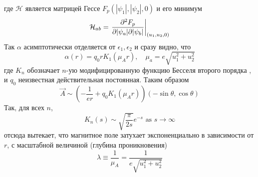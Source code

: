 где \( \mathcal{H} \) является матрицей Гессе \( F_p(|\psi_1|, |\psi_2|, 0) \) 
и его минимум
\begin{equation}
    \mathcal{H}_{ab} = \left. \frac{\partial^2 F_p}{\partial |\psi_a| \partial |\psi_b|} 
        \right|_{(u_1, u_2, 0)}
    \label{eq:12}
\end{equation}
Так \( \alpha \) асимптотически отделяется от \( \epsilon_1, \epsilon_2\) и 
сразу видно, что
\begin{equation}
    \alpha(r) = q_0 r K_1(\mu_A r), \quad
    \mu_a = e\sqrt{u_1^2 + u_2^2}
    \label{eq:13}
\end{equation}
где \( K_n \) обозначает \( n \)-ую модифицированную функцию Бесселя второго 
порядка \cite{bib:23}, и \( q_0 \) неизвестная действительная постоянная. 
Таким образом
\begin{equation}
    \vec{A} \sim \left( -\frac{1}{er} + q_0 K_1(\mu_A r) \right)
        (-\sin\theta, \cos\theta)
    \label{eq:14}
\end{equation}
Так, для всех \( n \), 
\begin{equation}
    K_n(s) \sim \sqrt{\frac{\pi}{2s}}e^{-s} \text{ as } s \rightarrow \infty
    \label{eq:15}
\end{equation}
отсюда вытекает, что магнитное поле затухает экспоненциально в зависимости от 
\( r \), с масштабной величиной (глубина проникновения)
\begin{equation}
    \lambda \equiv \frac{1}{\mu_A} = \frac{1}{e\sqrt{u_1^2 + u_2^2}}
    \label{eq:16}
\end{equation}

